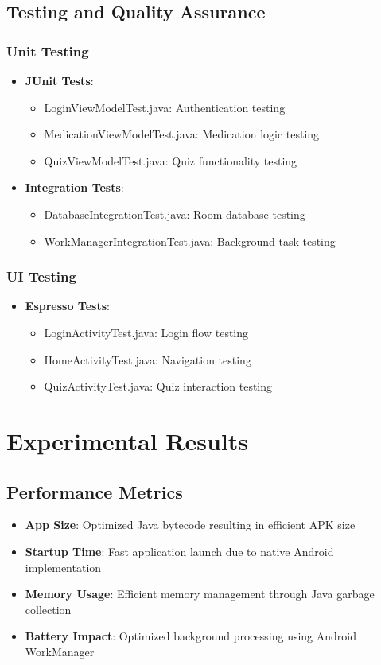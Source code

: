 \section{Testing and Quality Assurance}
\subsection{Unit Testing}
\begin{itemize}
    \item \textbf{JUnit Tests}:
    \begin{itemize}
        \item LoginViewModelTest.java: Authentication testing
        \item MedicationViewModelTest.java: Medication logic testing
        \item QuizViewModelTest.java: Quiz functionality testing
    \end{itemize}
    
    \item \textbf{Integration Tests}:
    \begin{itemize}
        \item DatabaseIntegrationTest.java: Room database testing
        \item WorkManagerIntegrationTest.java: Background task testing
    \end{itemize}
\end{itemize}

\subsection{UI Testing}
\begin{itemize}
    \item \textbf{Espresso Tests}:
    \begin{itemize}
        \item LoginActivityTest.java: Login flow testing
        \item HomeActivityTest.java: Navigation testing
        \item QuizActivityTest.java: Quiz interaction testing
    \end{itemize}
\end{itemize}

\chapter{Experimental Results}
\section{Performance Metrics}
\begin{itemize}
    \item \textbf{App Size}: Optimized Java bytecode resulting in efficient APK size
    \item \textbf{Startup Time}: Fast application launch due to native Android implementation
    \item \textbf{Memory Usage}: Efficient memory management through Java garbage collection
    \item \textbf{Battery Impact}: Optimized background processing using Android WorkManager
\end{itemize}

